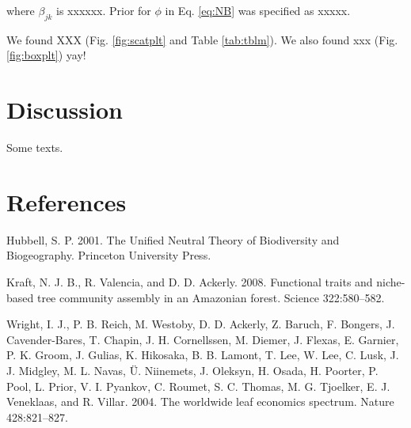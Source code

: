 \documentclass[12pt,]{article}
\begin{document}
where \(\beta_{jk}\) is xxxxxx. Prior for \(\phi\) in Eq. \eqref{eq:NB}
was specified as xxxxx.

We found XXX (Fig. \ref{fig:scatplt} and Table \ref{tab:tblm}). We also
found xxx (Fig. \ref{fig:boxplt}) yay!

\hypertarget{discussion}{%
\section{Discussion}\label{discussion}}

Some texts.

\hypertarget{references}{%
\section{References}\label{references}}

\hypertarget{refs}{}
\leavevmode\hypertarget{ref-Hubbell2001}{}%
Hubbell, S. P. 2001. The Unified Neutral Theory of Biodiversity and
Biogeography. Princeton University Press.

\leavevmode\hypertarget{ref-Kraft2008}{}%
Kraft, N. J. B., R. Valencia, and D. D. Ackerly. 2008. Functional traits
and niche-based tree community assembly in an Amazonian forest. Science
322:580--582.

\leavevmode\hypertarget{ref-Wright2004a}{}%
Wright, I. J., P. B. Reich, M. Westoby, D. D. Ackerly, Z. Baruch, F.
Bongers, J. Cavender-Bares, T. Chapin, J. H. Cornellssen, M. Diemer, J.
Flexas, E. Garnier, P. K. Groom, J. Gulias, K. Hikosaka, B. B. Lamont,
T. Lee, W. Lee, C. Lusk, J. J. Midgley, M. L. Navas, Ü. Niinemets, J.
Oleksyn, H. Osada, H. Poorter, P. Pool, L. Prior, V. I. Pyankov, C.
Roumet, S. C. Thomas, M. G. Tjoelker, E. J. Veneklaas, and R. Villar.
2004. The worldwide leaf economics spectrum. Nature 428:821--827.

\newpage

\hypertarget{section}{%
\section{}\label{section}}
\end{document}
